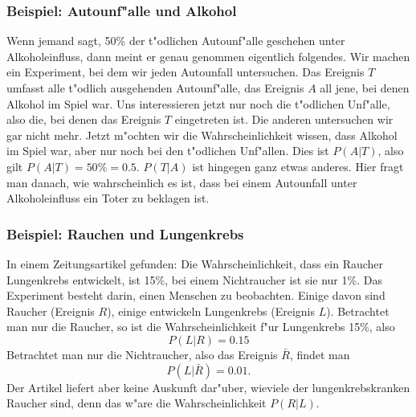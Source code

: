 \subsubsection{Beispiel: Autounf"alle und Alkohol}
Wenn jemand sagt, 50\%
der t"odlichen Autounf"alle geschehen unter Alkoholeinfluss, dann
meint er genau genommen eigentlich folgendes. Wir machen ein Experiment,
bei dem wir jeden Autounfall untersuchen. Das Ereignis $T$ umfasst alle
t"odlich ausgehenden Autounf"alle, das Ereignis $A$ all jene, bei denen
Alkohol im Spiel war. Uns interessieren jetzt nur noch die t"odlichen
Unf"alle, also die, bei denen das Ereignis $T$ eingetreten ist. 
Die anderen untersuchen wir gar nicht mehr. Jetzt m"ochten wir die
Wahrscheinlichkeit wissen, dass Alkohol im Spiel war, aber nur noch
bei den t"odlichen Unf"allen. Dies ist $P(A|T)$, also gilt
$P(A|T)=50\% = 0.5$.
$P(T|A)$ ist hingegen ganz etwas anderes. Hier fragt man danach,
wie wahrscheinlich es ist, dass bei einem Autounfall unter Alkoholeinfluss
ein Toter zu beklagen ist.

\subsubsection{Beispiel: Rauchen und Lungenkrebs}
In einem Zeitungsartikel gefunden: Die Wahrscheinlichkeit, dass ein Raucher
Lungenkrebs entwickelt, ist 15\%, bei einem Nichtraucher ist sie nur 1\%.
Das Experiment besteht darin, einen Menschen zu beobachten. Einige
davon sind Raucher (Ereignis $R$), einige entwickeln Lungenkrebs (Ereignis $L$).
Betrachtet man nur die Raucher, so ist die Wahrscheinlichkeit f"ur
Lungenkrebs 15\%, also
\[
P(L|R)=0.15
\]
Betrachtet man nur die Nichtraucher, also das Ereignis $\bar R$, findet
man 
\[
P(L|\bar R)=0.01.
\]
Der Artikel liefert aber keine Auskunft dar"uber, wieviele der
lungenkrebskranken Raucher sind, denn das w"are die Wahrscheinlichkeit
$P(R|L)$.

